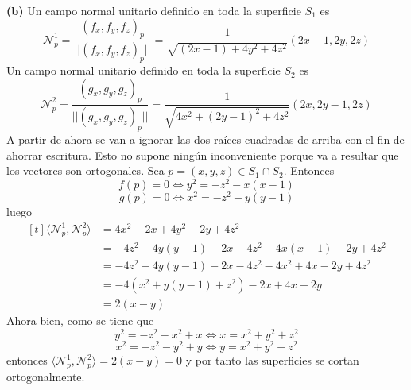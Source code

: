 \documentclass[12pt]{report}
\begin{document}
\vspace{2mm}
\textbf{(b) }
Un campo normal unitario definido en toda la superficie $S_1$ es
\[\mathcal{N}_p^1 = \frac{(f_x,f_y,f_z)_p}{||(f_x,f_y,f_z)_p||} = \frac{1}{\sqrt{(2x-1)+4y^2+4z^2}}(2x-1,2y,2z)\]
Un campo normal unitario definido en toda la superficie $S_2$ es
\[\mathcal{N}_p^2 = \frac{(g_x,g_y,g_z)_p}{||(g_x,g_y,g_z)_p||} = \frac{1}{\sqrt{4x^2+(2y-1)^2+4z^2}}(2x,2y-1,2z)\]
A partir de ahora se van a ignorar las dos raíces cuadradas de arriba con el fin de ahorrar escritura. Esto no supone ningún inconveniente porque va a resultar que los vectores son ortogonales. Sea $p =(x,y,z)\in S_1 \cap S_2$. Entonces
\[
f(p)=0 \iff y^2 = -z^2-x(x-1)
\]
\[
g(p)=0 \iff x^2 = -z^2-y(y-1)
\]
luego
\[
\begin{aligned}[t]
\langle \mathcal{N}_p^1,\mathcal{N}_p^2 \rangle &= 4x^2-2x+4y^2-2y+4z^2 \\
&=-4z^2-4y(y-1)-2x-4z^2-4x(x-1)-2y+4z^2 \\
&=-4z^2-4y(y-1)-2x-4z^2-4x^2+4x-2y+4z^2 \\
&=-4(x^2+y(y-1)+z^2)-2x+4x-2y \\
&= 2(x-y)
\end{aligned}
\]
Ahora bien, como se tiene que
\[y^2 = -z^2-x^2+x \iff x = x^2+y^2+z^2\]
\[x^2 = -z^2-y^2+y \iff y = x^2+y^2+z^2\]
entonces $\langle \mathcal{N}_p^1,\mathcal{N}_p^2 \rangle = 2(x-y) = 0$ y por tanto las superficies se cortan ortogonalmente.
\end{document}
